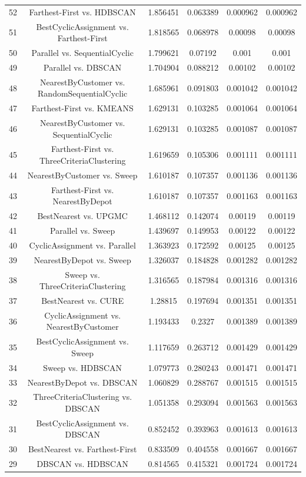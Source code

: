 \documentclass[a4paper,10pt]{article}
\begin{document}
\begin{landscape}
\begin{table}[!htp]
\begin{tabular}{cccccc}
52&Farthest-First vs. HDBSCAN&1.856451&0.063389&0.000962&0.000962\\
51&BestCyclicAssignment vs. Farthest-First&1.818565&0.068978&0.00098&0.00098\\
50&Parallel vs. SequentialCyclic&1.799621&0.07192&0.001&0.001\\
49&Parallel vs. DBSCAN&1.704904&0.088212&0.00102&0.00102\\
48&NearestByCustomer vs. RandomSequentialCyclic&1.685961&0.091803&0.001042&0.001042\\
47&Farthest-First vs. KMEANS&1.629131&0.103285&0.001064&0.001064\\
46&NearestByCustomer vs. SequentialCyclic&1.629131&0.103285&0.001087&0.001087\\
45&Farthest-First vs. ThreeCriteriaClustering&1.619659&0.105306&0.001111&0.001111\\
44&NearestByCustomer vs. Sweep&1.610187&0.107357&0.001136&0.001136\\
43&Farthest-First vs. NearestByDepot&1.610187&0.107357&0.001163&0.001163\\
42&BestNearest vs. UPGMC&1.468112&0.142074&0.00119&0.00119\\
41&Parallel vs. Sweep&1.439697&0.149953&0.00122&0.00122\\
40&CyclicAssignment vs. Parallel&1.363923&0.172592&0.00125&0.00125\\
39&NearestByDepot vs. Sweep&1.326037&0.184828&0.001282&0.001282\\
38&Sweep vs. ThreeCriteriaClustering&1.316565&0.187984&0.001316&0.001316\\
37&BestNearest vs. CURE&1.28815&0.197694&0.001351&0.001351\\
36&CyclicAssignment vs. NearestByCustomer&1.193433&0.2327&0.001389&0.001389\\
35&BestCyclicAssignment vs. Sweep&1.117659&0.263712&0.001429&0.001429\\
34&Sweep vs. HDBSCAN&1.079773&0.280243&0.001471&0.001471\\
33&NearestByDepot vs. DBSCAN&1.060829&0.288767&0.001515&0.001515\\
32&ThreeCriteriaClustering vs. DBSCAN&1.051358&0.293094&0.001563&0.001563\\
31&BestCyclicAssignment vs. DBSCAN&0.852452&0.393963&0.001613&0.001613\\
30&BestNearest vs. Farthest-First&0.833509&0.404558&0.001667&0.001667\\
29&DBSCAN vs. HDBSCAN&0.814565&0.415321&0.001724&0.001724\\

\end{tabular}
\end{table}
\end{landscape}
\end{document}
